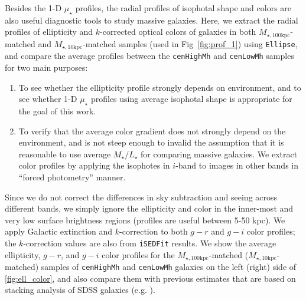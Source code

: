\documentclass{emulateapj}
\def\rbcg{\texttt{cenHighMh}}
\def\nbcg{\texttt{cenLowMh}}
\def\minn{{$M_{\star,10\mathrm{kpc}}$}}
\def\mtot{{$M_{\star,100\mathrm{kpc}}$}}
\def\m2l{{$M_{\star}/L_{\star}$}}
\def\mden{{$\mu_{\star}$}}
\begin{document}
\begin{CJK*}{UTF8}{gbsn}
    Besides the 1-D \mden{} profiles, the radial profiles of isophotal shape and colors 
    are also useful diagnostic tools to study massive galaxies. 
    Here, we extract the radial profiles of ellipticity and $k$-corrected optical colors
    of galaxies in both \mtot{}-matched and \minn{}-matched samples (used in 
    Fig~\ref{fig:prof_1}) using \texttt{Ellipse}, and compare the average profiles between
    the \rbcg{} and \nbcg{} samples for two main purposes:
    
    \begin{enumerate}
        \item To see whether the ellipticity profile strongly depends on environment, 
            and to see whether 1-D \mden{} profiles using average isophotal shape is 
            appropriate for the goal of this work.
        
        \item To verify that the average color gradient does not strongly depend on 
            the environment, and is not steep enough to invalid the assumption that   
            it is reasonable to use average \m2l for comparing massive galaxies. 
            We extract color profiles by applying the isophotes in $i$-band to images 
            in other bands in ``forced photometry'' manner.  
    \end{enumerate}

    Since we do not correct the differences in sky subtraction and seeing across 
    different bands, we simply ignore the ellipticity and color in the inner-most and 
    very low surface brightness regions (profiles are useful between 5-50 kpc). 
    We apply Galactic extinction and $k$-correction to both $g-r$ and $g-i$ color 
    profiles; the $k$-correction values are also from \texttt{iSEDFit} results.
    We show the average ellipticity, $g-r$, and $g-i$ color profiles for the 
    \mtot{}-matched (\minn{}-matched) samples of \rbcg{} and \nbcg{} galaxies on the 
    left (right) side of \ref{fig:ell_color}, and also compare them with previous 
    estimates that are based on stacking analysis of SDSS galaxies 
    (e.g. \citealt{LaBarbera2010, Tal2011, DSouza2014}).


\end{CJK*}
\end{document}
